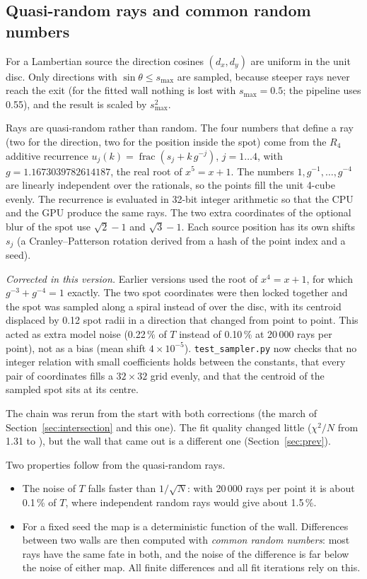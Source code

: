 \documentclass[11pt,a4paper]{article}
\newcommand{\code}[1]{\texttt{#1}}
\begin{document}
\subsection{Quasi-random rays and common random numbers}

For a Lambertian source the direction cosines $(d_x,d_y)$ are uniform in the unit disc. Only
directions with $\sin\theta\le s_\mathrm{max}$ are sampled, because steeper rays never reach the exit
(for the fitted wall nothing is lost with $s_\mathrm{max}=0.5$; the pipeline uses 0.55), and the
result is scaled by $s_\mathrm{max}^2$.

Rays are quasi-random rather than random. The four numbers that define a ray (two for the direction,
two for the position inside the spot) come from the $R_4$ additive recurrence
$u_j(k)=\operatorname{frac}(s_j+k\,g^{-j})$, $j=1\ldots4$, with $g=1.1673039782614187$, the real root
of $x^5=x+1$. The numbers $1,g^{-1},\ldots,g^{-4}$ are linearly independent over the rationals, so
the points fill the unit 4-cube evenly. The recurrence is evaluated in 32-bit integer arithmetic so
that the CPU and the GPU produce the same rays. The two extra coordinates of the optional blur of the
spot use $\sqrt2-1$ and $\sqrt3-1$. Each source position has its own shifts $s_j$ (a
Cranley--Patterson rotation derived from a hash of the point index and a seed).

\emph{Corrected in this version.} Earlier versions used the root of $x^4=x+1$, for which
$g^{-3}+g^{-4}=1$ exactly. The two spot coordinates were then locked together and the spot was
sampled along a spiral instead of over the disc, with its centroid displaced by 0.12 spot radii in a
direction that changed from point to point. This acted as extra model noise (0.22\,\% of $T$ instead
of 0.10\,\% at 20\,000 rays per point), not as a bias (mean shift $4\times10^{-5}$).
\code{test\_sampler.py} now checks that no integer relation with small coefficients holds between
the constants, that every pair of coordinates fills a $32\times32$ grid evenly, and that the centroid
of the sampled spot sits at its centre.

The chain was rerun from the start with both corrections (the march of
Section~\ref{sec:intersection} and this one). The fit quality changed little ($\chi^2/N$ from 1.31 to
\ChiTwo), but the wall that came out is a different one (Section~\ref{sec:prev}).

Two properties follow from the quasi-random rays.
\begin{itemize}
\item The noise of $T$ falls faster than $1/\sqrt{N}$: with 20\,000 rays per point it is about
0.1\,\% of $T$, where independent random rays would give about 1.5\,\%.
\item For a fixed seed the map is a deterministic function of the wall. Differences between two
walls are then computed with \emph{common random numbers}: most rays have the same fate in both, and
the noise of the difference is far below the noise of either map. All finite differences and all
fit iterations rely on this.
\end{itemize}
\end{document}
